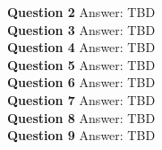 \documentclass[jou]{apa6}
\begin{document}
\vspace{10pt}
{\bf Question 2} Answer: TBD\\

\vspace{10pt}
{\bf Question 3} Answer: TBD\\

\vspace{10pt}
{\bf Question 4} Answer: TBD\\

\vspace{10pt}
{\bf Question 5} Answer: TBD\\

\vspace{10pt}
{\bf Question 6} Answer: TBD\\

\vspace{10pt}
{\bf Question 7} Answer: TBD\\

\vspace{10pt}
{\bf Question 8} Answer: TBD\\

\vspace{10pt}
{\bf Question 9} Answer: TBD\\
\end{document}

